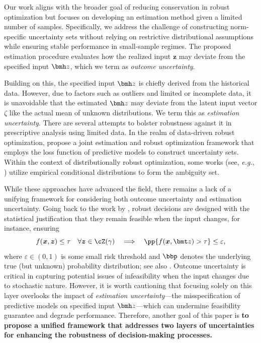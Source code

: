 \documentclass[mnsc, nonblindrev]{informswp}
\newcommand{\1}[1]{\mathds{1}{\left(#1\right)}}
\begin{document}
Our work aligns with the broader goal of reducing conservation in robust optimization but focuses on developing an estimation method given a limited number of samples. Specifically, we address the challenge of constructing norm-specific uncertainty sets without relying on restrictive distributional assumptions while ensuring stable performance in small-sample regimes.
The proposed estimation procedure evaluates how the realized input $\bm z$ may deviate from the specified input $\bmh z$, which we term as \emph{outcome uncertainty}.

Building on this, the specified input $\bmh z$ is chiefly derived from the historical data. However, due to factors such as outliers and limited or incomplete data, it is unavoidable that the estimated $\bmh z$ may deviate from the latent input vector $\zeta$ like the actual mean of unknown distributions. We term this as \emph{estimation uncertainty}. There are several attempts to bolster robustness against it in prescriptive analysis using limited data. In the realm of data-driven robust optimization, \cite{Zhu_Xie_Sim_2021joint} propose a joint estimation and robust optimization framework that employs the loss function of predictive models to construct uncertainty sets. Within the context of distributionally robust optimization, some works (see, \textit{e.g.}, \citealt{bertsimas2022bootstrap, Esteban_Morales_2021distributionally,Bertsimas_McCord_Sturt_2022dynamic}) utilize empirical conditional distributions to form the ambiguity set.

While these approaches have advanced the field, there remains a lack of a unifying framework for considering both outcome uncertainty and estimation uncertainty. Going back to the work by \cite{bertsimas2004price}, robust decisions are designed with the statistical justification that they remain feasible when the input changes, for instance, ensuring 
\[
f(\bm x, \bm z) \leq \tau \quad \forall \bm z \in \cZ(\gamma) ~~~\Longrightarrow~~~
\pp{f(\bm x, \bmt z) > \tau} \leq \varepsilon,
\]
where $\varepsilon \in (0,1)$ is some small risk threshold and $\bbp$ denotes the underlying true (but unknown) probability distribution; see also \cite{bertsimas2021probabilistic}. Outcome uncertainty is critical in capturing potential issues of infeasibility when the input changes due to stochastic nature. However, it is worth cautioning that focusing solely on this layer overlooks the impact of \emph{estimation uncertainty}---the misspecification of predictive models on specified input $\bmh z$---which can undermine feasibility guarantee and degrade performance. Therefore, another goal of this paper is {\bf to propose a unified framework that addresses two layers of uncertainties for enhancing the robustness of decision-making processes.}
\end{document}
